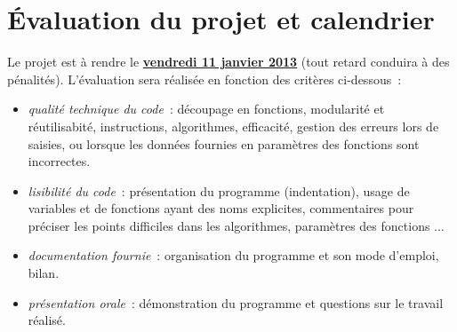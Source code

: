 \documentclass[10pt]{article}
\begin{document}
\section{Évaluation du projet et calendrier}

Le projet est à rendre le \underline{\bf vendredi 11 janvier 2013} 
(tout retard conduira à des pénalités). L'évaluation sera réalisée en fonction 
des critères ci-dessous~:
\begin{itemize}

\item  \textit{qualité technique du code}~: découpage en fonctions, modularité et réutilisabité, instructions, algorithmes, efficacité, gestion des erreurs lors de saisies, ou lorsque les données fournies en paramètres des fonctions sont incorrectes.

\item \textit{lisibilité du code}~: présentation du programme (indentation), usage de variables et de fonctions ayant des noms explicites, commentaires pour préciser les points difficiles dans les algorithmes, paramètres des fonctions $\ldots$ 

\item \textit{documentation fournie}~: organisation du programme et son mode d'emploi, bilan.

\item \textit{présentation orale}~: démonstration du programme et questions sur le travail r\'ealis\'e.


\end{itemize}
\end{document}
